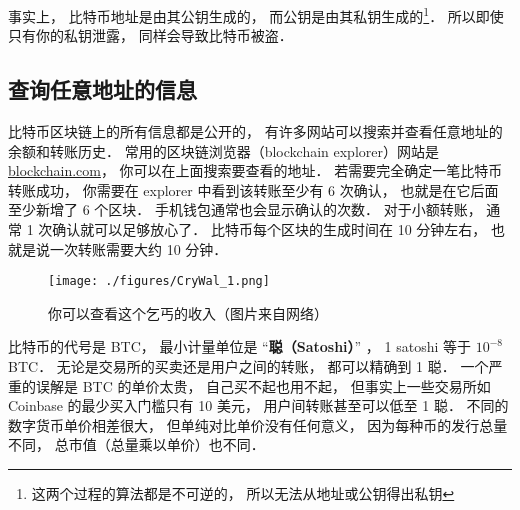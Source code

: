事实上， 比特币地址是由其公钥生成的， 而公钥是由其私钥生成的\footnote{这两个过程的算法都是不可逆的， 所以无法从地址或公钥得出私钥}． 所以即使只有你的私钥泄露， 同样会导致比特币被盗．

\subsection{查询任意地址的信息}
比特币区块链上的所有信息都是公开的， 有许多网站可以搜索并查看任意地址的余额和转账历史． 常用的区块链浏览器（blockchain explorer）网站是 \href{https://blockchain.com}{blockchain.com}， 你可以在上面搜索要查看的地址． 若需要完全确定一笔比特币转账成功， 你需要在 explorer 中看到该转账至少有 6 次确认， 也就是在它后面至少新增了 6 个区块． 手机钱包通常也会显示确认的次数． 对于小额转账， 通常 1 次确认就可以足够放心了． 比特币每个区块的生成时间在 10 分钟左右， 也就是说一次转账需要大约 10 分钟．
\begin{figure}[ht]
\centering
\texttt{[image: ./figures/CryWal\_1.png]}
\caption{你可以查看这个乞丐的收入（图片来自网络）} \label{CryWal_fig1}
\end{figure}

比特币的代号是 BTC， 最小计量单位是 “\textbf{聪（Satoshi）}” ， 1 satoshi 等于 $10^{-8}$ BTC． 无论是交易所的买卖还是用户之间的转账， 都可以精确到 1 聪． 一个严重的误解是 BTC 的单价太贵， 自己买不起也用不起， 但事实上一些交易所如 Coinbase 的最少买入门槛只有 10 美元， 用户间转账甚至可以低至 1 聪． 不同的数字货币单价相差很大， 但单纯对比单价没有任何意义， 因为每种币的发行总量不同， 总市值（总量乘以单价）也不同．

